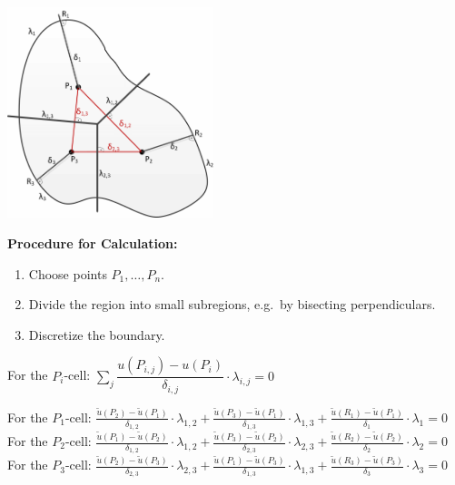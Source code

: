 \begin{minipage}{6cm}
	\includegraphics[width=6cm]{Content/02_numerics/FVM1.png}
\end{minipage}
\hfill
\begin{minipage}{12cm}
\textbf{Procedure for Calculation:}
\begin{enumerate}
\item Choose points $P_1,\ldots,P_n$.
\item Divide the region into small subregions, e.g.\ by bisecting perpendiculars.
\item Discretize the boundary.
\end{enumerate}

For the $P_i$-cell: $\sum\limits_{j} \dfrac{u(P_{i,j}) - u(P_i)}{\delta_{i,j}} \cdot \lambda_{i,j} = 0$

For the $P_1$-cell: $\frac{\tilde{u}(P_2)-\tilde{u}(P_1)}{\delta_{1,2}}\cdot\lambda_{1,2}+\frac{\tilde{u}(P_3)-\tilde{u}(P_1)}{\delta_{1,3}}\cdot\lambda_{1,3}+\frac{\tilde{u}(R_1)-\tilde{u}(P_1)}{\delta_1}\cdot\lambda_1=0$\\

For the $P_2$-cell: $\frac{\tilde{u}(P_1)-\tilde{u}(P_2)}{\delta_{1,2}}\cdot\lambda_{1,2}+\frac{\tilde{u}(P_3)-\tilde{u}(P_2)}{\delta_{2,3}}\cdot\lambda_{2,3}+\frac{\tilde{u}(R_2)-\tilde{u}(P_2)}{\delta_2}\cdot\lambda_2=0$\\

For the $P_3$-cell: $\frac{\tilde{u}(P_2)-\tilde{u}(P_3)}{\delta_{2,3}}\cdot\lambda_{2,3}+\frac{\tilde{u}(P_1)-\tilde{u}(P_3)}{\delta_{1,3}}\cdot\lambda_{1,3}+\frac{\tilde{u}(R_3)-\tilde{u}(P_3)}{\delta_3}\cdot\lambda_3=0$\\
\end{minipage}


